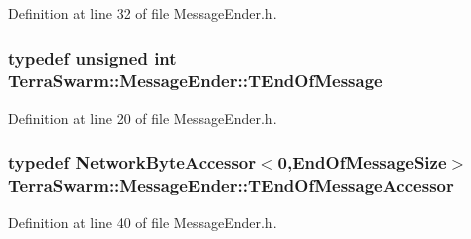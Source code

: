 Definition at line 32 of file Message\-Ender.\-h.

\hypertarget{class_terra_swarm_1_1_message_ender_a34ecb0835fc9e09799dd1a30fcf5ff65}{
\subsubsection[{T\-End\-Of\-Message}]{\setlength{\rightskip}{0pt plus 5cm}typedef unsigned int {\bf Terra\-Swarm\-::\-Message\-Ender\-::\-T\-End\-Of\-Message}\hspace{0.3cm}{\ttfamily [private]}}}\label{class_terra_swarm_1_1_message_ender_a34ecb0835fc9e09799dd1a30fcf5ff65}


Definition at line 20 of file Message\-Ender.\-h.

\hypertarget{class_terra_swarm_1_1_message_ender_aa82232ef2e15f3c918e5d8187dff86f8}{
\subsubsection[{T\-End\-Of\-Message\-Accessor}]{\setlength{\rightskip}{0pt plus 5cm}typedef {\bf Network\-Byte\-Accessor}$<$0,{\bf End\-Of\-Message\-Size}$>$ {\bf Terra\-Swarm\-::\-Message\-Ender\-::\-T\-End\-Of\-Message\-Accessor}\hspace{0.3cm}{\ttfamily [private]}}}\label{class_terra_swarm_1_1_message_ender_aa82232ef2e15f3c918e5d8187dff86f8}


Definition at line 40 of file Message\-Ender.\-h.



